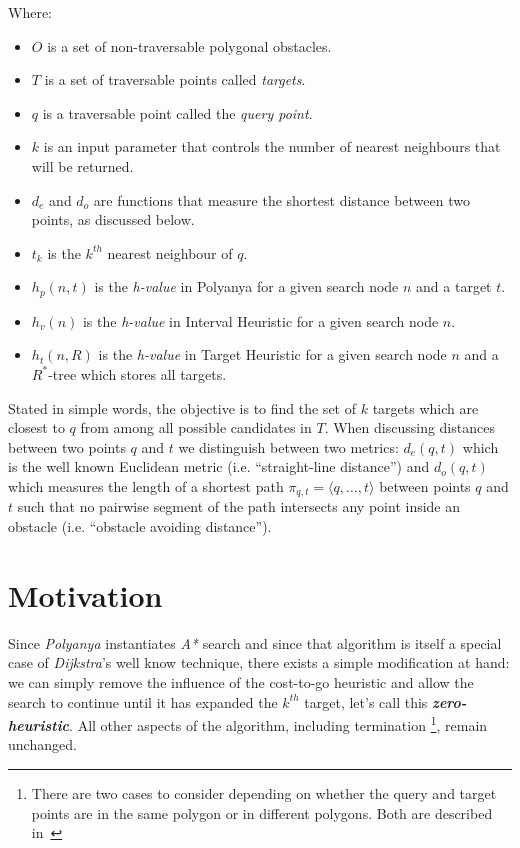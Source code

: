 \noindent Where:
\begin{itemize}[leftmargin=+1cm]
\item $O$ is a set of non-traversable polygonal obstacles.
\item $T$ is a set of traversable points called \emph{targets}.
\item $q$ is a traversable point called the \emph{query point}.
\item $k$ is an input parameter that controls the number of nearest neighbours that will be returned.
\item $d_e$ and $d_o$ are functions that measure the shortest distance between two points, as discussed below.
\item $t_k$ is the $k^{th}$ nearest neighbour of $q$.
\item $h_p(n, t)$ is the \textit{h-value} in Polyanya for a given search node $n$ and a target
  $t$.
\item $h_v(n)$ is the \textit{h-value} in Interval Heuristic for a given search node $n$.
\item $h_t(n, R)$ is the \textit{h-value} in Target Heuristic for a given search node $n$ and a
  $R^*$-tree which stores all targets.
\end{itemize}
\noindent
Stated in simple words, the objective is to find the set of $k$ targets which are closest to $q$ from among all possible candidates in $T$.
When discussing distances between two points $q$ and $t$ we distinguish between two metrics:
$d_e(q, t)$ which is the well known Euclidean metric (i.e. ``straight-line distance'')
and $d_o(q, t)$ which measures the length of a shortest path $\pi_{q, t} = \langle q, \ldots, t\rangle$ between points $q$ and $t$ such that
no pairwise segment of the path intersects any point inside an obstacle (i.e. ``obstacle avoiding distance'').


\section{Motivation}\label{mot}
Since \textit{Polyanya} instantiates \textit{A*} search and since that algorithm is itself a
special case of \textit{Dijkstra}'s well know technique, there exists a simple modification at
hand: we can simply remove the influence of the cost-to-go heuristic and allow the search to
continue until it has expanded the $k^{th}$ target, let's call this \textbf{\textit{zero-heuristic}}.
All other aspects of the algorithm, including termination
\footnote{There are two cases to consider depending on whether the query and target points are in the same polygon or in different polygons.
Both are described in~\cite{cuicompromise}}, remain unchanged.

